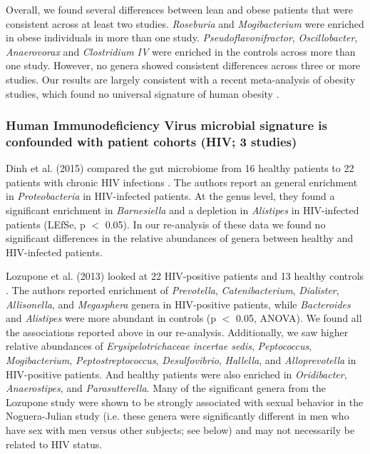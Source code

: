 Overall, we found several differences between lean and obese patients that were consistent across at least two studies.
\textit{Roseburia} and \textit{Mogibacterium} were enriched in obese individuals in more than one study. \textit{Pseudoflavonifractor}, \textit{Oscillobacter}, \textit{Anaerovorax} and \textit{Clostridium IV} were enriched in the controls across more than one study. However, no genera showed consistent differences across three or more studies.
Our results are largely consistent with a recent meta-analysis of obesity studies, which found no universal signature of human obesity \cite{Sze07092016}.

\subsubsection{Human Immunodeficiency Virus microbial signature is confounded with patient cohorts (HIV; 3 studies)}

Dinh et al. (2015) compared the gut microbiome from 16 healthy patients to 22 patients with chronic HIV infections \cite{hiv-dinh}.
The authors report an general enrichment in \textit{Proteobacteria} in HIV-infected patients.
At the genus level, they found a significant enrichment in \textit{Barnesiella} and a depletion in \textit{Alistipes} in HIV-infected patients (LEfSe, p $<$ 0.05).
In our re-analysis of these data we found no significant differences in the relative abundances of genera between healthy and HIV-infected patients.

Lozupone et al. (2013) looked at 22 HIV-positive patients and 13 healthy controls \cite{lozupone2013alterations}.
The authors reported enrichment of \textit{Prevotella}, \textit{Catenibacterium}, \textit{Dialister}, \textit{Allisonella}, and \textit{Megasphera} genera in HIV-positive patients, while \textit{Bacteroides} and \textit{Alistipes} were more abundant in controls (p $<$ 0.05, ANOVA).
We found all the associations reported above in our re-analysis.
Additionally, we saw higher relative abundances of \textit{Erysipelotrichaceae incertae sedis}, \textit{Peptococcus}, \textit{Mogibacterium}, \textit{Peptostreptococcus}, \textit{Desulfovibrio}, \textit{Hallella}, and \textit{Alloprevotella} in HIV-positive patients.
And healthy patients were also enriched in \textit{Oridibacter}, \textit{Anaerostipes}, and \textit{Parasutterella}.
Many of the significant genera from the Lozupone study were shown to be strongly associated with sexual behavior in the Noguera-Julian study (i.e. these genera were significantly different in men who have sex with men versus other subjects; see below) and may not necessarily be related to HIV status.


